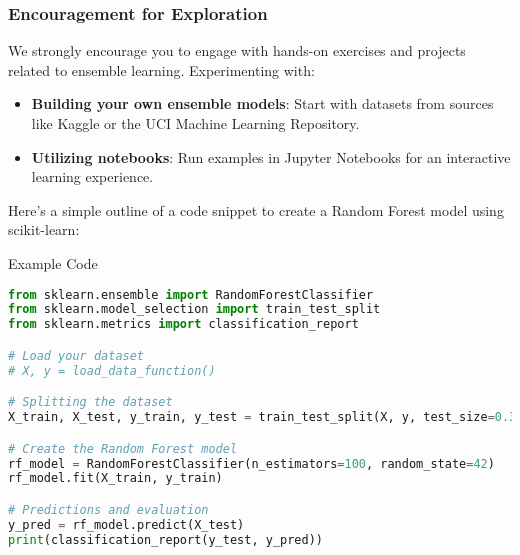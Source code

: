 \documentclass[aspectratio=169]{beamer}
\begin{document}
\begin{frame}[fragile]
  \frametitle{Encouragement for Exploration}
  We strongly encourage you to engage with hands-on exercises and projects related to ensemble learning. Experimenting with:
  
  \begin{itemize}
    \item \textbf{Building your own ensemble models}: Start with datasets from sources like Kaggle or the UCI Machine Learning Repository.
    \item \textbf{Utilizing notebooks}: Run examples in Jupyter Notebooks for an interactive learning experience.
  \end{itemize}

  Here’s a simple outline of a code snippet to create a Random Forest model using scikit-learn:

  \begin{block}{Example Code}
  \begin{lstlisting}[language=Python]
from sklearn.ensemble import RandomForestClassifier
from sklearn.model_selection import train_test_split
from sklearn.metrics import classification_report

# Load your dataset
# X, y = load_data_function() 

# Splitting the dataset
X_train, X_test, y_train, y_test = train_test_split(X, y, test_size=0.3, random_state=42)

# Create the Random Forest model
rf_model = RandomForestClassifier(n_estimators=100, random_state=42)
rf_model.fit(X_train, y_train)

# Predictions and evaluation
y_pred = rf_model.predict(X_test)
print(classification_report(y_test, y_pred))
  \end{lstlisting}
  \end{block}
\end{frame}
\end{document}
